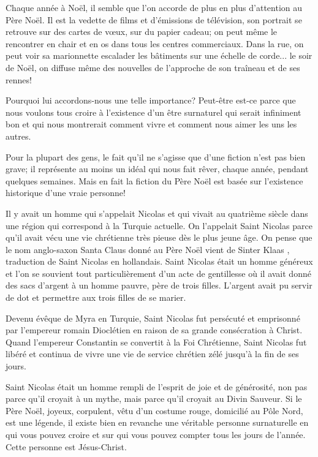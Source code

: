 
Chaque année à Noël, il semble que l'on accorde de plus en plus d'attention au Père Noël. Il est la vedette de films et d'émissions de télévision, son portrait se retrouve sur des cartes de vœux, sur du papier cadeau; on peut même le rencontrer \og en chair et en os \fg{} dans tous les centres commerciaux. Dans la rue, on peut voir sa marionnette escalader les bâtiments sur une échelle de corde... le soir de Noël, on diffuse même des nouvelles de l'approche de son traîneau et de ses rennes!

Pourquoi lui accordons-nous une telle importance? Peut-être est-ce parce que nous voulons tous croire à l'existence d'un être surnaturel qui serait infiniment bon et qui nous montrerait comment vivre et comment nous aimer les uns les autres.

Pour la plupart des gens, le fait qu'il ne s'agisse que d'une fiction n'est pas bien grave; il représente au moins un idéal qui nous fait rêver, chaque année, pendant quelques semaines. Mais en fait la fiction du Père Noël est basée sur l'existence historique d'une vraie personne!

Il y avait un homme qui s'appelait Nicolas et qui vivait au quatrième siècle dans une région qui correspond à la Turquie actuelle. On l'appelait Saint Nicolas parce qu'il avait vécu une vie chrétienne très pieuse dès le plus jeune âge. On pense que le nom anglo-saxon \og Santa Claus \fg{} donné au Père Noël vient de \og Sinter Klaas \fg{}, traduction de \og Saint Nicolas \og{} en hollandais. Saint Nicolas était un homme généreux et l'on se souvient tout particulièrement d'un acte de gentillesse où il avait donné des sacs d'argent à un homme pauvre, père de trois filles. L'argent avait pu servir de dot et permettre aux trois filles de se marier.

Devenu évêque de Myra en Turquie, Saint Nicolas fut persécuté et emprisonné par l'empereur romain Dioclétien en raison de sa grande consécration à Christ. Quand l'empereur Constantin se convertit à la Foi Chrétienne, Saint Nicolas fut libéré et continua de vivre une vie de service chrétien zélé jusqu'à la fin de ses jours.

Saint Nicolas était un homme rempli de l'esprit de joie et de générosité, non pas parce qu'il croyait à un mythe, mais parce qu'il croyait au Divin Sauveur. Si le Père Noël, joyeux, corpulent, vêtu d'un costume rouge, domicilié au Pôle Nord, est une légende, il existe bien en revanche une véritable personne surnaturelle en qui vous pouvez croire et sur qui vous pouvez compter tous les jours de l'année. Cette personne est Jésus-Christ.

